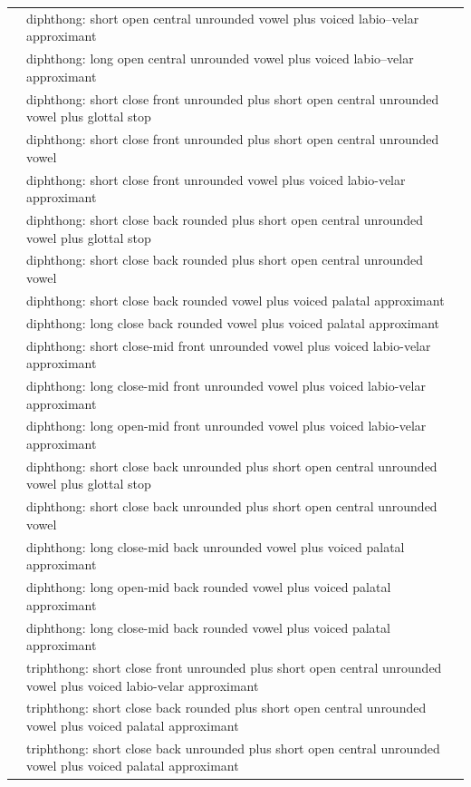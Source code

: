 \documentclass{article}
\begin{document}
\begin{xltabular}{\textwidth}{lL}
   & diphthong: short open central unrounded vowel plus voiced labio–velar approximant \\
   & diphthong: long open central unrounded vowel plus voiced labio–velar approximant\\
   & diphthong: short close front unrounded plus short open central unrounded vowel plus glottal stop \\
   & diphthong: short close front unrounded plus short open central unrounded vowel \\
   & diphthong: short close front unrounded vowel plus voiced labio-velar approximant \\
   & diphthong: short close back rounded plus short open central unrounded vowel plus glottal stop \\
   & diphthong: short close back rounded plus short open central unrounded vowel \\
   & diphthong: short close back rounded vowel plus voiced palatal approximant \\
   & diphthong: long close back rounded vowel plus voiced palatal approximant \\
   & diphthong: short close-mid front unrounded vowel plus voiced labio-velar approximant \\
   & diphthong: long close-mid front unrounded vowel plus voiced labio-velar approximant \\
   & diphthong: long open-mid front unrounded vowel plus voiced labio-velar approximant \\
   & diphthong: short close back unrounded plus short open central unrounded vowel plus glottal stop \\
   & diphthong: short close back unrounded plus short open central unrounded vowel \\
   & diphthong: long close-mid back unrounded vowel plus voiced palatal approximant \\
   & diphthong: long open-mid back rounded vowel plus voiced palatal approximant \\
   & diphthong: long close-mid back rounded vowel plus voiced palatal approximant \\
   & triphthong: short close front unrounded plus short open central unrounded vowel plus voiced labio-velar approximant \\
   & triphthong: short close back rounded plus short open central unrounded vowel plus voiced palatal approximant \\
   & triphthong: short close back unrounded plus short open central unrounded vowel plus voiced palatal approximant \\
\end{xltabular}
\end{document}
